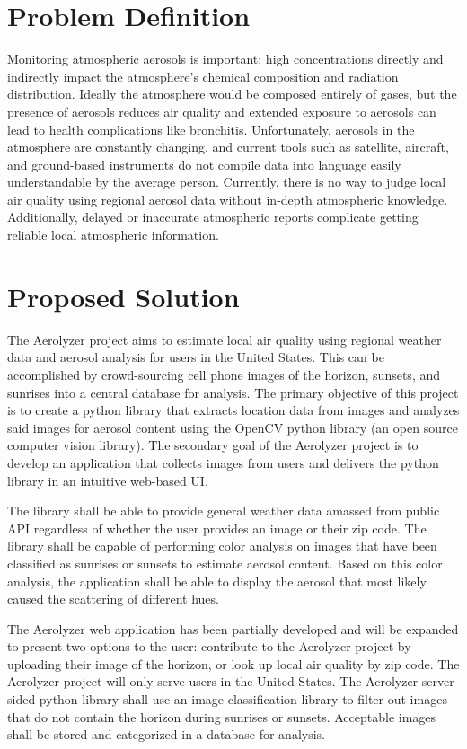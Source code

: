 \documentclass[letterpaper,10pt,draftclsnofoot,onecolumn]{IEEEtran}
\begin{document}
\clearpage
\begin{flushleft}
\section{Problem Definition}
Monitoring atmospheric aerosols is important; high concentrations directly and indirectly impact the atmosphere's chemical composition and radiation distribution. Ideally the atmosphere would be composed entirely of gases, but the presence of aerosols reduces air quality and extended exposure to aerosols can lead to health complications like bronchitis. Unfortunately, aerosols in the atmosphere are constantly changing, and current tools such as satellite, aircraft, and ground-based instruments do not compile data into language easily understandable by the average person. Currently, there is no way to judge local air quality using regional aerosol data without in-depth atmospheric knowledge. Additionally, delayed or inaccurate atmospheric reports complicate getting reliable local atmospheric information. 

\section{Proposed Solution}
The Aerolyzer project aims to estimate local air quality using regional weather data and aerosol analysis for users in the United States. This can be accomplished by crowd-sourcing cell phone images of the horizon, sunsets, and sunrises into a central database for analysis. The primary objective of this project is to create a python library that extracts location data from images and analyzes said images for aerosol content using the OpenCV python library (an open source computer vision library). The secondary goal of the Aerolyzer project is to develop an application that collects images from users and delivers the python library in an intuitive web-based UI. 
\par
The library shall be able to provide general weather data amassed from public API regardless of whether the user provides an image or their zip code. The library  shall be capable of performing color analysis on images that have been classified as sunrises or sunsets to estimate aerosol content. Based on this color analysis, the application shall be able to display the aerosol that most likely caused the scattering of different hues.
\par
The Aerolyzer web application has been partially developed and will be expanded to present two options to the user: contribute to the Aerolyzer project by uploading their image of the horizon, or look up local air quality by zip code. The Aerolyzer project will only serve users in the United States. The Aerolyzer server-sided python library shall use an image classification library to filter out images that do not contain the horizon during sunrises or sunsets. Acceptable images shall be stored and categorized in a database for analysis. 


\end{flushleft}
\end{document}
